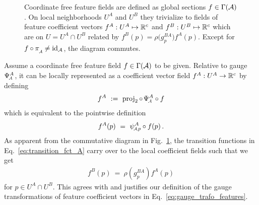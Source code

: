 \begin{figure}
    \centering
    \caption{\small
        Coordinate free feature fields are defined as global sections $f\in\Gamma(\mathcal{A})$.
        On local neighborhoods $U^A$ and $U^B$ they trivialize to fields of feature coefficient vectors $f^A:U^A\mapsto\mathbb{R}^c$ and $f^B:U^B\mapsto\mathbb{R}^c$ which are on $U=U^A\cap U^B$ related by $f^B(p)=\rho\big(g_p^{BA}\big)f^A(p)$.
        Except for $f\circ\piA \neq \id_{\A}$, the diagram commutes.
    }
    \label{fig:trivialization_A_sections}
\end{figure}


Assume a coordinate free feature field $f\in\Gamma(\mathcal{A})$ to be given.
Relative to gauge $\PsiA^A$, it can be locally represented as a coefficient vector field $f^A:U^A\to\mathbb{R}^c$ by defining
\begin{align}
    f^A\ :=\ \proj_2 \circ\mkern2mu \PsiA^A \circ f
\end{align}
which is equivalent to the pointwise definition
\begin{align}
    f^A(p)\ =\ \psiAp^A \circ f(p) \,.
\end{align}
As apparent from the commutative diagram in Fig.~\ref{fig:trivialization_A_sections}, the transition functions in Eq.~\eqref{eq:transition_fct_A} carry over to the local coefficient fields such that we get
\begin{align}
    f^B(p)\ =\ \rho\left(g_p^{BA}\right) f^A(p)
\end{align}
for $p\in U^A\cap U^B$.
This agrees with and justifies our definition of the gauge transformations of feature coefficient vectors in Eq.~\eqref{eq:gauge_trafo_features}.







